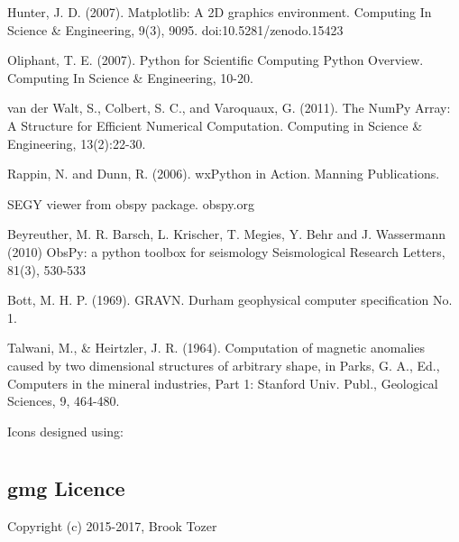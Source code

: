 \documentclass[a4paper,10pt,english]{sphinxmanual}
\begin{document}

Hunter, J. D. (2007). Matplotlib: A 2D graphics environment. Computing In Science \& Engineering, 9(3),
90\textendash{}95. doi:10.5281/zenodo.15423


Oliphant, T. E. (2007). Python for Scientific Computing Python Overview. Computing In Science \& Engineering, 10-20.


van der Walt, S., Colbert, S. C., and Varoquaux, G. (2011). The NumPy Array: A Structure for Efficient
Numerical Computation. Computing in Science \& Engineering, 13(2):22-30.


Rappin, N. and Dunn, R. (2006). wxPython in Action. Manning Publications.


SEGY viewer from obspy package. obspy.org

Beyreuther, M. R. Barsch, L. Krischer, T. Megies, Y. Behr and J. Wassermann (2010) ObsPy: a python toolbox for
seismology Seismological Research Letters, 81(3), 530-533


Bott, M. H. P. (1969). GRAVN. Durham geophysical computer specification No. 1.


Talwani, M., \& Heirtzler, J. R. (1964). Computation of magnetic anomalies caused by two dimensional structures of
arbitrary shape, in Parks, G. A., Ed., Computers in the mineral industries, Part 1: Stanford Univ. Publ., Geological
Sciences, 9, 464-480.


Icons designed using: 


\section{}
\label{\detokenize{licence:licencing}}\label{\detokenize{licence:licence}}\label{\detokenize{licence::doc}}

\subsection{gmg Licence}
\label{\detokenize{licence:gmg-licence}}
Copyright (c) 2015-2017, Brook Tozer
\end{document}
